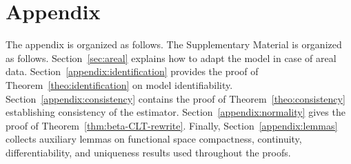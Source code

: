 \documentclass[11pt]{article}
\begin{document}







\appendix
	\section*{Appendix}
The appendix is organized as follows. The Supplementary Material is organized as follows. Section~\ref{sec:areal} explains how to adapt the model in case of areal data. Section~\ref{appendix:identification} provides the proof of Theorem~\ref{theo:identification} on model identifiability.  
Section~\ref{appendix:consistency} contains the proof of Theorem~\ref{theo:consistency} establishing consistency of the estimator.  
Section~\ref{appendix:normality} gives the proof of Theorem~\ref{thm:beta-CLT-rewrite}.  
Finally, Section~\ref{appendix:lemmas} collects auxiliary lemmas on functional space compactness, continuity, differentiability, and uniqueness results used throughout the proofs.  
\end{document}
